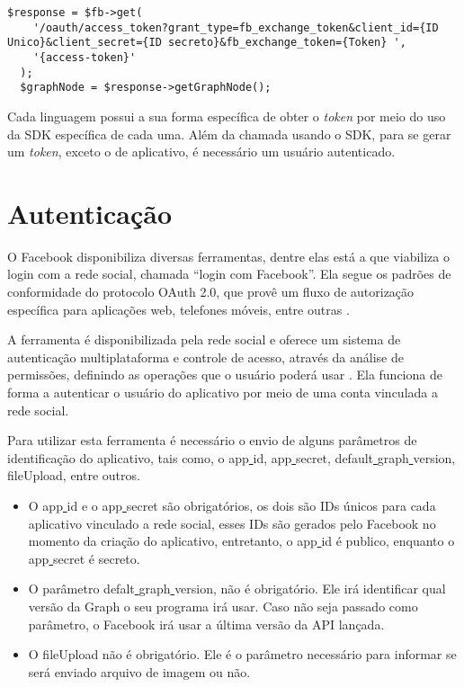 \begin{lstlisting}[caption={Obtendo Token Infinito},label={lst:tokeninfinito}]
  $response = $fb->get(
    '/oauth/access_token?grant_type=fb_exchange_token&client_id={ID Unico}&client_secret={ID secreto}&fb_exchange_token={Token} ',
    '{access-token}'
  );
  $graphNode = $response->getGraphNode();
\end{lstlisting}

Cada linguagem possui a sua forma específica de obter o \textit{token} por meio do uso da SDK específica de cada uma. Além da chamada usando o SDK, para se gerar um \textit{token}, exceto o de aplicativo, é necessário um usuário autenticado.

\section{Autenticação}
\label{sec:autenticacao}
O Facebook disponibiliza diversas ferramentas, dentre elas está a que viabiliza o login com a rede social, chamada ``login com Facebook''. Ela segue os padrões de conformidade do protocolo OAuth 2.0, que provê um fluxo de autorização específica para aplicações web, telefones móveis, entre outras \cite{oauth2018}. 

A ferramenta é disponibilizada pela rede social e oferece um sistema de autenticação multiplataforma e controle de acesso, através da análise de permissões, definindo as operações que o usuário poderá usar \cite{facebook2018c}. Ela funciona de forma a autenticar o usuário do aplicativo por meio de uma conta vinculada a rede social.

Para utilizar esta ferramenta é necessário o envio de alguns parâmetros de identificação do aplicativo, tais como, o app\underline{{ }}id, app\underline{{ }}secret, default\underline{{ }}graph\underline{{ }}version, fileUpload, entre outros.

\begin{itemize}
\item O app\underline{{ }}id e o app\underline{{ }}secret são obrigatórios, os dois são IDs únicos para cada aplicativo vinculado a rede social, esses IDs são gerados pelo Facebook no momento da criação do aplicativo, entretanto, o app\underline{{ }}id é publico, enquanto o app\underline{{ }}secret é secreto.

\item O parâmetro defalt\underline{{ }}graph\underline{{ }}version, não é obrigatório. Ele irá identificar qual versão da Graph o seu programa irá usar. Caso não seja passado como parâmetro, o Facebook irá usar a última versão da API lançada.

\item O fileUpload não é obrigatório. Ele é o parâmetro necessário para informar se será enviado arquivo de imagem ou não.
\end{itemize}

